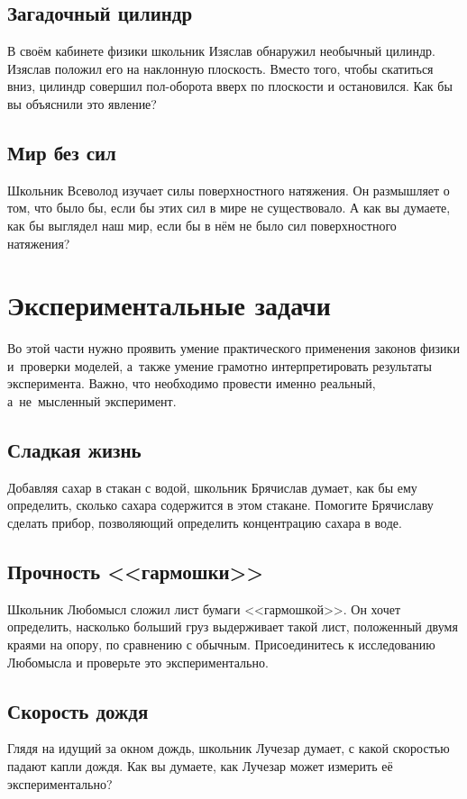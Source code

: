 \documentclass[a4paper,12pt]{article}
\begin{document}
\subsection{Загадочный цилиндр}
В своём кабинете физики школьник Изяслав обнаружил необычный цилиндр.
Изяслав положил его на наклонную плоскость. Вместо того, чтобы скатиться вниз,
цилиндр совершил пол-оборота вверх по плоскости и остановился.
Как бы вы объяснили это явление?

\subsection{Мир без сил}
Школьник Всеволод изучает силы поверхностного натяжения. Он размышляет о том, что было бы,
если бы этих сил в мире не существовало. А как вы думаете, как бы выглядел наш мир,
если бы в нём не было сил поверхностного натяжения?

\newpage

\section{Экспериментальные задачи}

Во этой части нужно проявить умение практического применения законов физики
и~проверки моделей, а~также умение грамотно интерпретировать результаты
эксперимента. Важно, что необходимо провести именно реальный,
а~не~мысленный эксперимент.

\subsection{Сладкая жизнь}
Добавляя сахар в стакан с водой, школьник Брячислав думает, как бы ему определить,
сколько сахара содержится в этом стакане. Помогите Брячиславу сделать прибор, позволяющий
определить концентрацию сахара в воде.

\subsection{Прочность <<гармошки>>}
Школьник Любомысл сложил лист бумаги <<гармошкой>>. Он хочет определить, насколько б\emph{о}льший
груз выдерживает такой лист, положенный двумя краями на опору, по сравнению с обычным.
Присоединитесь к исследованию Любомысла и проверьте это экспериментально.

\subsection{Скорость дождя}
Глядя на идущий за окном дождь, школьник Лучезар думает, с какой скоростью падают капли дождя.
Как вы думаете, как Лучезар может измерить её экспериментально?
\end{document}
